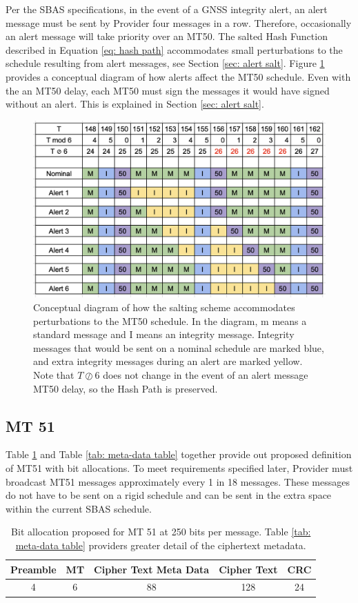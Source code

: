 \documentclass[letterpaper,times]{IONconf/IONconf}
\begin{document}
Per the SBAS specifications, in the event of a GNSS integrity alert, an alert message must be sent by Provider four messages in a row.
Therefore,  occasionally an alert message will take priority over an MT50.
The salted Hash Function described in Equation \eqref{eq: hash path} accommodates small perturbations to the schedule resulting from alert messages, see Section \ref{sec: alert salt}.
Figure \ref{fig: alert schedule} provides a conceptual diagram of how alerts affect the MT50 schedule.
Even with the an MT50 delay, each MT50 must sign the messages it would have signed without an alert.
This is explained in Section \ref{sec: alert salt}.

\begin{figure}
\centering
\includegraphics[width=0.5\linewidth]{fig/alertschedule.png}
\caption{Conceptual diagram of how the salting scheme accommodates perturbations to the MT50 schedule. In the diagram, m means a standard message and I means an integrity message. Integrity messages that would be sent on a nominal schedule are marked blue, and extra integrity messages during an alert are marked yellow. Note that $T \oslash 6$ does not change in the event of an alert message MT50 delay, so the Hash Path is preserved.}
\label{fig: alert schedule}
\end{figure}

\subsection{MT 51}
Table \ref{tab: high-level table} and Table \ref{tab: meta-data table} together provide out proposed definition of MT51 with bit allocations.
To meet requirements specified later, Provider must broadcast MT51 messages approximately every 1 in 18 messages.
These messages do not have to be sent on a rigid schedule and can be sent in the extra space within the current SBAS schedule.

\begin{table}[H]
\center
\begin{tabular}{|c|c|c|c|c|} \hline
	Preamble & MT & Cipher Text Meta Data & Cipher Text & CRC \\ \hline
	4 & 6 & 88 & 128 & 24 \\ \hline
\end{tabular}
\caption{Bit allocation proposed for MT 51 at 250 bits per message. Table \ref{tab: meta-data table} providers greater detail of the ciphertext metadata.}
\label{tab: high-level table}
\end{table}
\end{document}
